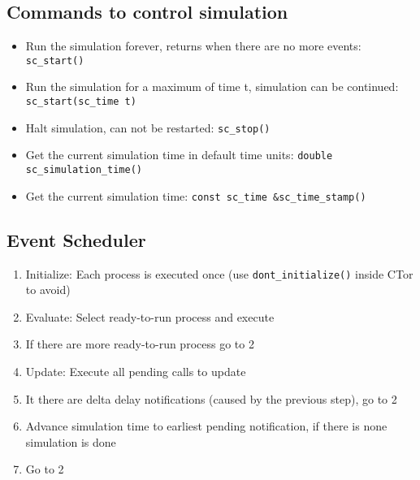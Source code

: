 \subsection{Commands to control simulation}
\begin{itemize}
    \item Run the simulation forever, returns when there are no more events: \lstinline{sc_start()} 
    \item Run the simulation for a maximum of time t, simulation can be continued: \lstinline{sc_start(sc_time t)} 
    \item Halt simulation, can not be restarted: \lstinline{sc_stop()}
    \item Get the current simulation time in default time units: \lstinline{double sc_simulation_time()}
    \item Get the current simulation time: \lstinline{const sc_time &sc_time_stamp()}
\end{itemize}

\subsection{Event Scheduler}
\begin{enumerate}
    \item Initialize: Each process is executed once (use \lstinline{dont_initialize()} inside CTor to avoid)
    \item Evaluate: Select ready-to-run process and execute
    \item If there are more ready-to-run process go to 2
    \item Update: Execute all pending calls to update
    \item It there are delta delay notifications (caused by the previous step), go to 2
    \item Advance simulation time to earliest pending notification, if there is none simulation is done
    \item Go to 2
\end{enumerate}
